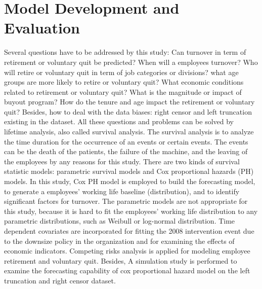 \documentclass[12pt,letterpaper]{article}
\begin{document}
\section{Model Development and Evaluation}
Several questions have to be addressed by this study: Can turnover in term of retirement or voluntary quit be predicted? When will a employees turnover? Who will retire or voluntary quit in term of job categories or divisions? what age groups are more likely to retire or voluntary quit? What economic conditions related to retirement or voluntary quit? What is the magnitude or impact of buyout program? How do the tenure and age impact the retirement or voluntary quit? Besides, how to deal with the data biases: right censor and left truncation existing in the dataset. All these questions and problems can be solved by lifetime analysis, also called survival analysis. The survival analysis is to analyze the time duration for the occurrence of an events or certain events. The events can be the death of the patients, the failure of the machine, and the leaving of the employees by any reasons for this study. There are two kinds of survival statistic models: parametric survival models and Cox proportional hazards (PH) models. In this study, Cox PH model is employed to build the forecasting model, to generate a employees' working life baseline (distribution), and to identify significant factors for turnover. The parametric models are not appropriate for this study, because it is hard to fit the employees' working life distribution to any parametric distributions, such as Weibull or log-normal distribution. Time dependent covariates are incorporated for fitting the 2008 intervention event due to the downsize policy in the organization and for examining the effects of economic indicators. Competing risks analysis is applied for modeling employee retirement and voluntary quit. Besides, A simulation study is performed to examine the forecasting capability of cox proportional hazard model on the left truncation and right censor dataset.
\end{document}

